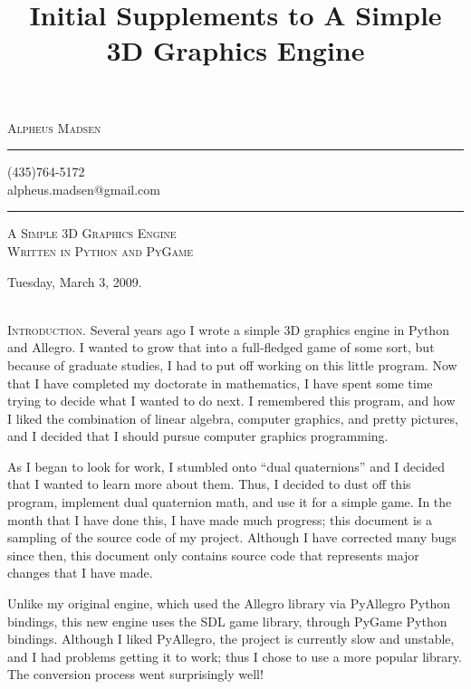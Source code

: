\documentclass[10pt]{article}
\title{Initial Supplements to A Simple 3D Graphics Engine}
\author{\headerstuff}
\date{}
\makeatletter
\newcommand{\titleize}[1]{
   \begin{center}
       \Large \textsc{#1} \normalsize \\
   \end{center}
}
\newcommand{\normaltitleize}[1]{\mbox{}\\ \textsc{#1} \normalsize}
\newcommand{\headerstuff}{
   \begin{center}
   \textsc{\Large{Alpheus Madsen}}

   \rule{1in}{.01in}

   (435)764-5172 \\

   alpheus.madsen@gmail.com

   \rule{2in}{.01in}
   \end{center}
}
\makeatother
\begin{document}

\headerstuff

\titleize{A Simple 3D Graphics Engine\\Written in Python and PyGame}

\begin{center}
   Tuesday, March 3, 2009.
\end{center}

\normaltitleize{Introduction.}  Several years ago I wrote a simple 3D graphics engine in Python and Allegro.  I wanted to grow that into a full-fledged game of some sort, but because of graduate studies, I had to put off working on this little program.  Now that I have completed my doctorate in mathematics, I have spent some time trying to decide what I wanted to do next.  I remembered this program, and how I liked the combination of linear algebra, computer graphics, and pretty pictures, and I decided that I should pursue computer graphics programming.

As I began to look for work, I stumbled onto ``dual quaternions'' and I decided that I wanted to learn more about them.  Thus, I decided to dust off this program, implement dual quaternion math, and use it for a simple game.  In the month that I have done this, I have made much progress; this document is a sampling of the source code of my project.  Although I have corrected many bugs since then, this document only contains source code that represents major changes that I have made.

Unlike my original engine, which used the Allegro library via PyAllegro Python bindings, this new engine uses the SDL game library, through PyGame Python bindings.  Although I liked PyAllegro, the project is currently slow and unstable, and I had problems getting it to work; thus I chose to use a more popular library.  The conversion process went surprisingly well!
\end{document}
